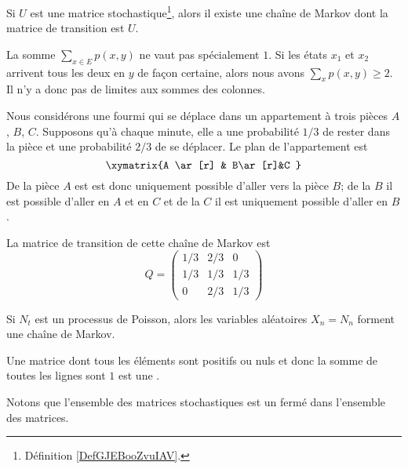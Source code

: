 \begin{lemma}
    Si \( U\) est une matrice stochastique\footnote{Définition \ref{DefGJEBooZvuIAV}.}, alors il existe une chaîne de Markov dont la matrice de transition est \( U\).
\end{lemma}

\begin{remark}
    La somme \( \sum_{x\in E}p(x,y)\) ne vaut pas spécialement \( 1\). Si les états \( x_1\) et \( x_2\) arrivent tous les deux en \( y\) de façon certaine, alors nous avons \( \sum_xp(x,y)\geq 2\). Il n'y a donc pas de limites aux sommes des colonnes.
\end{remark}

\begin{example}
    Nous considérons une fourmi qui se déplace dans un appartement à trois pièces \( A\), \( B\), \( C\). Supposons qu'à chaque minute, elle a une probabilité \( 1/3\) de rester dans la pièce et une probabilité \( 2/3\) de se déplacer. Le plan de l'appartement est
    \begin{equation}
        \xymatrix{%
        A \ar[r]      &  B\ar[r]&C
           }
    \end{equation}
    De la pièce \( A\) est est donc uniquement possible d'aller vers la pièce \( B\); de la \( B\) il est possible d'aller en \( A\) et en \( C\) et de la \( C\) il est uniquement possible d'aller en \( B\).

    La matrice de transition de cette chaîne de Markov est 
    \begin{equation}
        Q=\begin{pmatrix}
            1/3    &   2/3    &   0    \\
            1/3    &   1/3    &   1/3    \\
            0    &   2/3    &   1/3
        \end{pmatrix}
    \end{equation}
\end{example}

\begin{example}
    Si \( N_t\) est un processus de Poisson, alors les variables aléatoires \( X_n=N_n\) forment une chaîne de Markov.
\end{example}

\begin{definition}      \label{DefGJEBooZvuIAV}
    Une matrice dont tous les éléments sont positifs ou nuls et donc la somme de toutes les lignes sont \( 1\) est une .
\end{definition}
Notons que l'ensemble des matrices stochastiques est un fermé dans l'ensemble des matrices.

